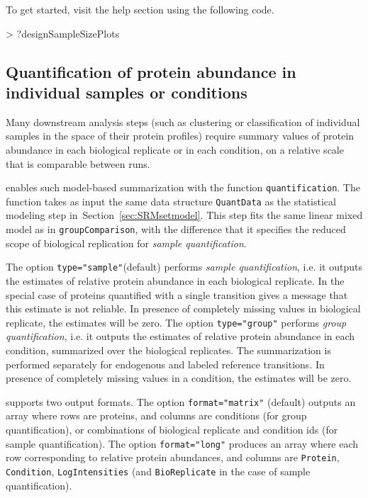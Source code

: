 \documentclass[11pt]{article}
\def\secref#1{Section~\ref{sec:#1}}
\begin{document}
To get started, visit the help section using the following code.
\begin{small}
\begin{Schunk}
\begin{Sinput}
> ?designSampleSizePlots
\end{Sinput}
\end{Schunk}
\end{small}

\subsection{Quantification of protein abundance in individual samples or conditions \label{sec:SRMquantification}}

Many downstream analysis steps (such as clustering or classification of individual samples in the space of their protein profiles) require summary values of protein abundance in each biological replicate or in each condition, on a relative scale that is comparable between runs. 

\m enables such model-based summarization with the function {\tt quantification}. The function takes as input the same data structure {\tt QuantData} as the statistical modeling step in~\secref{SRMsetmodel}. This step fits the same linear mixed model as in {\tt groupComparison}, with the difference that it specifies the reduced scope of biological replication for {\it sample quantification}.  

The option {\tt type="sample"}(default) performs {\it sample quantification}, i.e. it outputs the estimates of relative protein abundance in each biological replicate. In the special case of proteins quantified with a single transition \m gives a message that this estimate is not reliable. In presence of completely missing values in biological replicate, the estimates will be zero. The option {\tt type="group"}  performs {\it group quantification}, i.e. it outputs the estimates of relative protein abundance in each condition, summarized over the biological replicates. The summarization is performed separately for endogenous and labeled reference transitions. In presence of completely missing values in a condition, the estimates will be zero.

\m supports two output formats. The option {\tt format="matrix"} (default) outputs an array where rows are proteins, and columns are conditions (for group quantification), or combinations of biological replicate and condition ids (for sample quantification).  The option {\tt format="long"} produces an array where each row corresponding to relative protein abundances, and columns are {\tt Protein}, {\tt Condition}, {\tt LogIntensities} (and {\tt BioReplicate} in the case of sample quantification).\\
\end{document}
